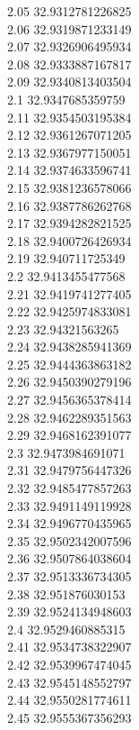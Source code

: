 {2.05	32.9312781226825\\
2.06	32.9319871233149\\
2.07	32.9326906495934\\
2.08	32.9333887167817\\
2.09	32.9340813403504\\
2.1	32.9347685359759\\
2.11	32.9354503195384\\
2.12	32.9361267071205\\
2.13	32.9367977150051\\
2.14	32.9374633596741\\
2.15	32.9381236578066\\
2.16	32.9387786262768\\
2.17	32.9394282821525\\
2.18	32.9400726426934\\
2.19	32.940711725349\\
2.2	32.9413455477568\\
2.21	32.9419741277405\\
2.22	32.9425974833081\\
2.23	32.94321563265\\
2.24	32.9438285941369\\
2.25	32.9444363863182\\
2.26	32.9450390279196\\
2.27	32.9456365378414\\
2.28	32.9462289351563\\
2.29	32.9468162391077\\
2.3	32.9473984691071\\
2.31	32.9479756447326\\
2.32	32.9485477857263\\
2.33	32.9491149119928\\
2.34	32.9496770435965\\
2.35	32.9502342007596\\
2.36	32.9507864038604\\
2.37	32.9513336734305\\
2.38	32.951876030153\\
2.39	32.9524134948603\\
2.4	32.9529460885315\\
2.41	32.9534738322907\\
2.42	32.9539967474045\\
2.43	32.9545148552797\\
2.44	32.9550281774611\\
2.45	32.9555367356293\\
}
